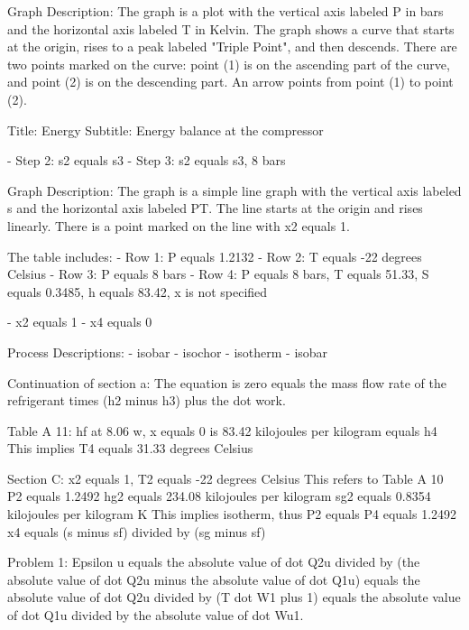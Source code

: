 Graph Description:
The graph is a plot with the vertical axis labeled P in bars and the horizontal axis labeled T in Kelvin. The graph shows a curve that starts at the origin, rises to a peak labeled "Triple Point", and then descends. There are two points marked on the curve: point (1) is on the ascending part of the curve, and point (2) is on the descending part. An arrow points from point (1) to point (2).

Title: Energy
Subtitle: Energy balance at the compressor

- Step 2: s2 equals s3
- Step 3: s2 equals s3, 8 bars

Graph Description:
The graph is a simple line graph with the vertical axis labeled s and the horizontal axis labeled PT. The line starts at the origin and rises linearly. There is a point marked on the line with x2 equals 1.

The table includes:
- Row 1: P equals 1.2132
- Row 2: T equals -22 degrees Celsius
- Row 3: P equals 8 bars
- Row 4: P equals 8 bars, T equals 51.33, S equals 0.3485, h equals 83.42, x is not specified

- x2 equals 1
- x4 equals 0

Process Descriptions:
- isobar
- isochor
- isotherm
- isobar

Continuation of section a:
The equation is zero equals the mass flow rate of the refrigerant times (h2 minus h3) plus the dot work.

Table A 11:
hf at 8.06 w, x equals 0 is 83.42 kilojoules per kilogram equals h4
This implies T4 equals 31.33 degrees Celsius

Section C:
x2 equals 1, T2 equals -22 degrees Celsius
This refers to Table A 10
P2 equals 1.2492
hg2 equals 234.08 kilojoules per kilogram
sg2 equals 0.8354 kilojoules per kilogram K
This implies isotherm, thus P2 equals P4 equals 1.2492
x4 equals (s minus sf) divided by (sg minus sf)

Problem 1:
Epsilon u equals the absolute value of dot Q2u divided by (the absolute value of dot Q2u minus the absolute value of dot Q1u) equals the absolute value of dot Q2u divided by (T dot W1 plus 1) equals the absolute value of dot Q1u divided by the absolute value of dot Wu1.